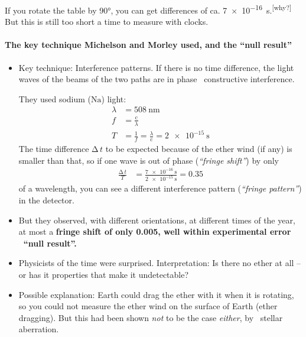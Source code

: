 \documentclass[pagesize,headsepline,10pt,parskip=half]{scrreprt}
\newcommand{\strong}[1]{\textbf{#1}}
\newcommand*\mdelta[1]{\ensuremath{\mathrm{\Delta\,}#1}}
\newcommand*\chem[1]{\ensuremath{\mathrm{#1}}}
\newcommand{\const}[1]{\ensuremath{\mathrm{#1}}}
\renewcommand{\c}{\const{c}}
\begin{document}
          If you rotate the table by 90°, you can get differences of
          ca. \SI{7e-16}{\second}.\textsuperscript{[why?]} But this is still
          too short a time to measure with clocks.

        \paragraph{The key technique Michelson and Morley used, and the “null result”}
          \begin{itemize}
            \item \begin{samepage}Key technique: Interference patterns.
              If there is no time difference, the light waves of the beams
              of the two paths are in phase \rightarrow~constructive interference.

              They used sodium (\chem{Na}) light:
              \begin{align*}
                \lambda &= \SI{508}{\nano\meter}\\
                f &= \frac{\c}{\lambda}\\
                T &= \frac{1}{f} = \frac{\lambda}{\c} = \SI{2e-15}{\second}
              \end{align*}
              The time difference \mdelta{t} to be expected because of
              the ether wind (if any) is smaller than that, so if one wave
              is out of phase (\emph{“fringe shift”}) by only
              \begin{align*}
                \frac{\mdelta{t}}{T} &= \frac{\SI{7e-16}{\second}}{\SI{2e-15}{\second}} = 0.35
              \end{align*}
              of a wavelength, you can see a different interference pattern
              (\emph{“fringe pattern”}) in the detector.\end{samepage}
            \item But they observed, with different orientations, at different
              times of the year, at most a \strong{fringe shift of
              only 0.005, well within experimental error
              \rightarrow~“null result”.}
            \item Physicists of the time were surprised.  Interpretation:
              Is there no ether at all {--} or has it properties that make it
              undetectable?
            \item Possible explanation: Earth could drag the ether with it
              when it is rotating, so you could not measure the ether wind on
              the surface of Earth (ether dragging).  But this had been shown
              \emph{not} to be the case \emph{either}, by
              \rightarrow~stellar aberration.
          \end{itemize}
\end{document}
